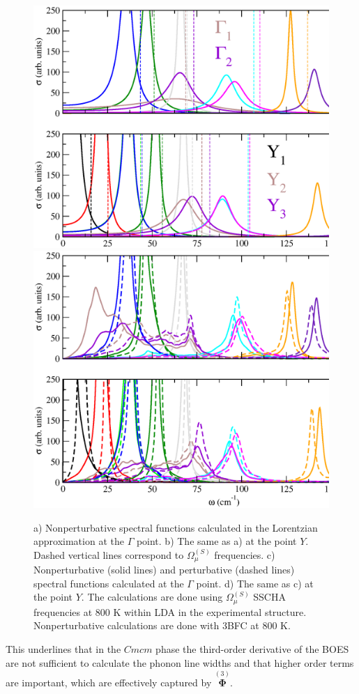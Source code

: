 \begin{figure}[th]
\begin{center}
\includegraphics[width=0.8\linewidth]{Figures/spectrum-lorentzian-snse.eps}
\includegraphics[width=0.8\linewidth]{Figures/spf-p-np-snse.eps}
\caption[Perturbative and nonperturbative spectral functions in SnSe.]{a) Nonperturbative spectral functions calculated in the Lorentzian approximation at the $\Gamma$ point. b) The same as a) at the point $Y$. Dashed vertical lines 
correspond to $\Omega^{(S)}_{\mu}$ frequencies. c) Nonperturbative (solid lines) and perturbative (dashed lines)
spectral functions calculated at the $\Gamma$ point. d) The same as c) at the point $Y$. The calculations are done 
using $\Omega^{(S)}_{\mu}$ SSCHA frequencies at $800$ K within LDA in the experimental structure. Nonperturbative 
calculations are done with 3BFC at $800$ K.}
\label{spf-p-np}
\end{center}
\end{figure}
This underlines that in the $Cmcm$ phase the third-order derivative of the BOES are not sufficient to calculate the phonon line widths and that higher order terms are important, which are effectively 
captured by $\overset{(3)}{\boldsymbol{\Phi}}$. \\

